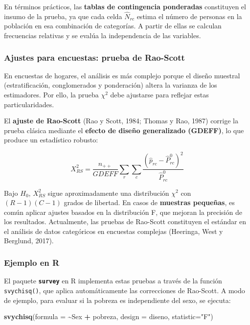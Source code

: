 \documentclass[
  spanish,
  12pt,
]{book}
\newenvironment{Shaded}{\begin{snugshade}}{\end{snugshade}}
\newcommand{\AttributeTok}[1]{\textcolor[rgb]{0.13,0.29,0.53}{#1}}
\newcommand{\FunctionTok}[1]{\textcolor[rgb]{0.13,0.29,0.53}{\textbf{#1}}}
\newcommand{\NormalTok}[1]{#1}
\newcommand{\SpecialCharTok}[1]{\textcolor[rgb]{0.81,0.36,0.00}{\textbf{#1}}}
\newcommand{\StringTok}[1]{\textcolor[rgb]{0.31,0.60,0.02}{#1}}
\begin{document}
En términos prácticos, las \textbf{tablas de contingencia ponderadas} constituyen el insumo de la prueba, ya que cada celda \(\hat{N}_{rc}\) estima el número de personas en la población en esa combinación de categorías. A partir de ellas se calculan frecuencias relativas y se evalúa la independencia de las variables.

\subsubsection{Ajustes para encuestas: prueba de Rao-Scott}\label{ajustes-para-encuestas-prueba-de-rao-scott}

En encuestas de hogares, el análisis es más complejo porque el diseño muestral (estratificación, conglomerados y ponderación) altera la varianza de los estimadores. Por ello, la prueba \(\chi^{2}\) debe ajustarse para reflejar estas particularidades.

El \textbf{ajuste de Rao-Scott} (Rao y Scott, 1984; Thomas y Rao, 1987) corrige la prueba clásica mediante el \textbf{efecto de diseño generalizado (GDEFF)}, lo que produce un estadístico robusto:

\[
X_{RS}^2 = \frac{n_{++}}{GDEFF} \sum_r \sum_c \frac{(\hat{p}_{rc} - \hat{P}_{rc}^0)^2}{\hat{P}_{rc}^0}
\]

Bajo \(H_0\), \(X_{RS}^2\) sigue aproximadamente una distribución \(\chi^2\) con \((R-1)(C-1)\) grados de libertad. En casos de \textbf{muestras pequeñas}, es común aplicar ajustes basados en la distribución F, que mejoran la precisión de los resultados. Actualmente, las pruebas de Rao-Scott constituyen el estándar en el análisis de datos categóricos en encuestas complejas (Heeringa, West y Berglund, 2017).

\subsubsection{Ejemplo en R}\label{ejemplo-en-r}

El paquete \textbf{\texttt{survey}} en R implementa estas pruebas a través de la función \texttt{svychisq()}, que aplica automáticamente las correcciones de Rao-Scott. A modo de ejemplo, para evaluar si la pobreza es independiente del sexo, se ejecuta:

\begin{Shaded}
\begin{Highlighting}[]
\FunctionTok{svychisq}\NormalTok{(}\AttributeTok{formula =} \SpecialCharTok{\textasciitilde{}}\NormalTok{Sex }\SpecialCharTok{+}\NormalTok{ pobreza, }\AttributeTok{design =}\NormalTok{ diseno, }\AttributeTok{statistic=}\StringTok{"F"}\NormalTok{)}
\end{Highlighting}
\end{Shaded}
\end{document}
